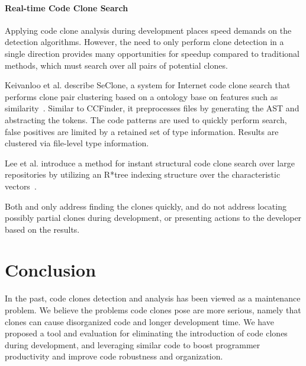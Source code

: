 \documentclass[nocopyrightspace,10pt]{sigplanconf}
\begin{document}
\paragraph{Real-time Code Clone Search}

Applying code clone analysis during development places speed demands
on the detection algorithms. However, the need to only perform clone
detection in a single direction provides many opportunities for
speedup compared to traditional methods, which must search
over all pairs of potential clones.

Keivanloo et al. describe SeClone, a system for Internet code clone
search that performs clone pair clustering based on a ontology base on
features such as similarity~\cite{Keivanloo2011}. Similar to CCFinder,
it preprocesses files by generating the AST and abstracting the
tokens. The code patterns are used to quickly perform search, false
positives are limited by a retained set of type information. Results
are clustered via file-level type information.

Lee et al. introduce a method for instant structural code clone search
over large repositories by utilizing an R*tree indexing structure over
the characteristic vectors~\cite{Lee2010}.

Both \cite{Keivanloo2011} and \cite{Lee2010} only address finding the
clones quickly, and do not address locating possibly partial clones
during development, or presenting actions to the developer based on
the results.

\section{Conclusion}
\label{sec:conclusion}

In the past, code clones detection and analysis has been viewed as a
maintenance problem. 
We believe the problems code clones pose are 
more serious, namely that clones can cause disorganized code and
longer development time.
We have proposed a tool and evaluation for
eliminating the introduction of code clones during development, and
leveraging similar code to boost programmer productivity and improve
code robustness and organization.

%

%
%
\end{document}
